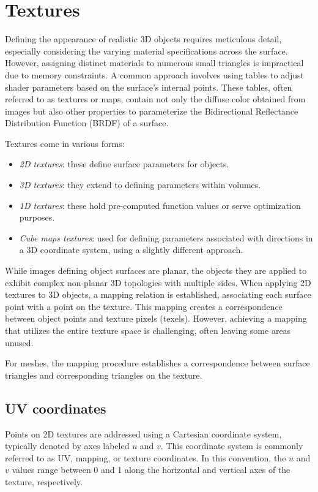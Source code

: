 \section{Textures}

Defining the appearance of realistic 3D objects requires meticulous detail, especially considering the varying material specifications across the surface. 
However, assigning distinct materials to numerous small triangles is impractical due to memory constraints. 
A common approach involves using tables to adjust shader parameters based on the surface's internal points. 
These tables, often referred to as textures or maps, contain not only the diffuse color obtained from images but also other properties to parameterize the Bidirectional Reflectance Distribution Function (BRDF) of a surface.

Textures come in various forms:
\begin{itemize}
    \item \textit{2D textures}: these define surface parameters for objects.
    \item \textit{3D textures}: they extend to defining parameters within volumes.
    \item \textit{1D textures}: these hold pre-computed function values or serve optimization purposes.
    \item \textit{Cube maps textures}: used for defining parameters associated with directions in a 3D coordinate system, using a slightly different approach.
\end{itemize}
While images defining object surfaces are planar, the objects they are applied to exhibit complex non-planar 3D topologies with multiple sides. 
When applying 2D textures to 3D objects, a mapping relation is established, associating each surface point with a point on the texture. 
This mapping creates a correspondence between object points and texture pixels (texels). 
However, achieving a mapping that utilizes the entire texture space is challenging, often leaving some areas unused.

For meshes, the mapping procedure establishes a correspondence between surface triangles and corresponding triangles on the texture.

\subsection{UV coordinates}
Points on 2D textures are addressed using a Cartesian coordinate system, typically denoted by axes labeled $u$ and $v$. 
This coordinate system is commonly referred to as UV, mapping, or texture coordinates. 
In this convention, the $u$ and $v$ values range between 0 and 1 along the horizontal and vertical axes of the texture, respectively.

